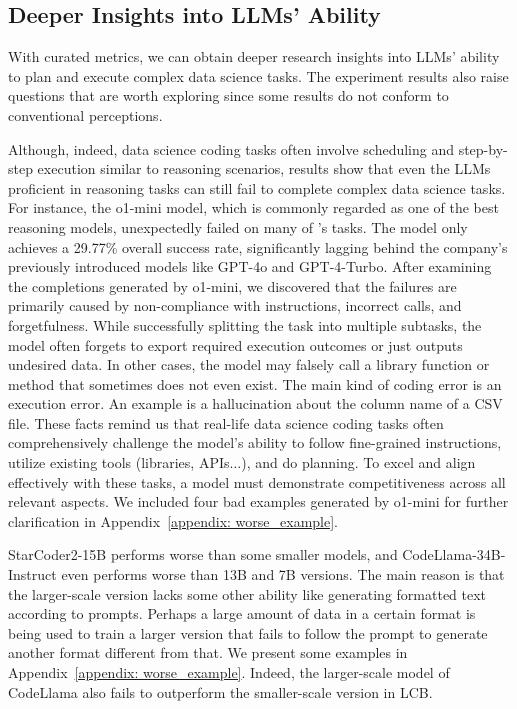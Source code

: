 \subsection{Deeper Insights into LLMs' Ability}
\label{sec: insights}
With curated metrics, we can obtain deeper research insights into LLMs' ability to plan and execute complex data science tasks. The experiment results also raise questions that are worth exploring since some results do not conform to conventional perceptions.


Although, indeed, data science coding tasks often involve scheduling and step-by-step execution similar to reasoning scenarios, results show that even the LLMs proficient in reasoning tasks can still fail to complete complex data science tasks. For instance, the o1-mini model, which is commonly regarded as one of the best reasoning models, unexpectedly failed on many of \benchmark's tasks. The model only achieves a 29.77\% overall success rate, significantly lagging behind the company's previously introduced models like GPT-4o and GPT-4-Turbo. After examining the completions generated by o1-mini, we discovered that the failures are primarily caused by non-compliance with instructions, incorrect calls, and forgetfulness. While successfully splitting the task into multiple subtasks, the model often forgets to export required execution outcomes or just outputs undesired data. In other cases, the model may falsely call a library function or method that sometimes does not even exist. 
The main kind of coding error is an execution error. An example is a hallucination about the column name of a CSV file.
These facts remind us that real-life data science coding tasks often comprehensively challenge the model's ability to follow fine-grained instructions, utilize existing tools (libraries, APIs$\ldots$), and do planning. To excel and align effectively with these tasks, a model must demonstrate competitiveness across all relevant aspects.
We included four bad examples generated by o1-mini for further clarification in Appendix~\ref{appendix: worse_example}.

StarCoder2-15B performs worse than some smaller models, and CodeLlama-34B-Instruct even performs worse than 13B and 7B versions. The main reason is that the larger-scale version lacks some other ability like generating formatted text according to prompts. Perhaps a large amount of data in a certain format is being used to train a larger version that fails to follow the prompt to generate another format different from that. We present some examples in Appendix~\ref{appendix: worse_example}. Indeed, the larger-scale model of CodeLlama also fails to outperform the smaller-scale version in LCB.

